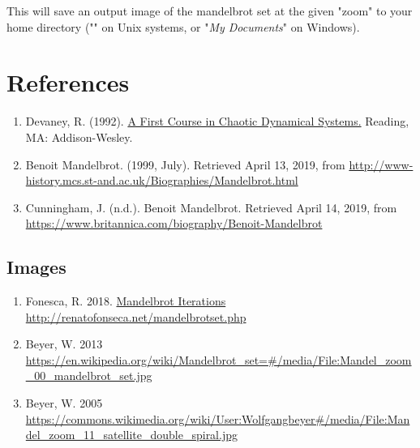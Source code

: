 \documentclass[20pt]{article} %
\begin{document}
This will save an output image of the mandelbrot set at the given "zoom" to your home directory ("" on Unix systems, or "\textit{My Documents}" on Windows).

\section{References}
\begin{enumerate}
\item Devaney, R. (1992). \url{A First Course in Chaotic Dynamical Systems.} Reading, MA: Addison-Wesley.
\item Benoit Mandelbrot. (1999, July). Retrieved April 13, 2019, from \url{http://www-history.mcs.st-and.ac.uk/Biographies/Mandelbrot.html}
\item Cunningham, J. (n.d.). Benoit Mandelbrot. Retrieved April 14, 2019, from\\ \url{https://www.britannica.com/biography/Benoit-Mandelbrot}
\end{enumerate}
\subsection{Images}
\begin{enumerate}
\item Fonesca, R. 2018. \url{Mandelbrot Iterations http://renatofonseca.net/mandelbrotset.php}
\item Beyer, W. 2013 \url{https://en.wikipedia.org/wiki/Mandelbrot_set=#/media/File:Mandel_zoom_00_mandelbrot_set.jpg}
\item Beyer, W. 2005 \url{https://commons.wikimedia.org/wiki/User:Wolfgangbeyer#/media/File:Mandel_zoom_11_satellite_double_spiral.jpg}
\end{enumerate}
\end{document}
